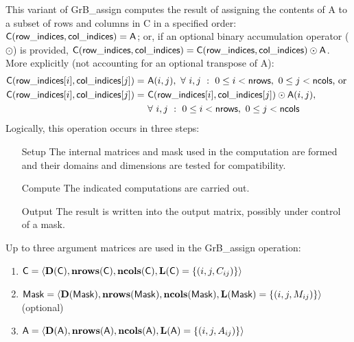This variant of {\sf GrB\_assign} computes the result of assigning the contents
of {\sf A} to a subset of rows and columns in {\sf C} in a specified order:
${\sf C}({\sf row\_indices},{\sf col\_indices}) = {\sf A}$; or, if an optional 
binary accumulation operator ($\odot$) is provided, 
${\sf C}({\sf row\_indices},{\sf col\_indices}) = 
{\sf C}({\sf row\_indices},{\sf col\_indices}) \odot {\sf A}$.
More explicitly (not accounting for an optional transpose of {\sf A}):
\[
\begin{aligned}
  	{\sf C}({\sf row\_indices}[i],{\sf col\_indices}[j]) = &\ {\sf A}(i,j), 
 	\ \forall \ i,j \ : \ 0 \leq i < {\sf nrows},\ 0 \leq j < {\sf ncols} \mbox{,~or~}
\\
  	{\sf C}({\sf row\_indices}[i],{\sf col\_indices}[j]) = &\ 
    {\sf C}({\sf row\_indices}[i],{\sf col\_indices}[j]) \odot {\sf A}(i,j), \\
 	& \ \forall \ i,j \ : \ 0 \leq i < {\sf nrows},\ 0 \leq j < {\sf ncols}
\end{aligned}
\]  
Logically, this operation occurs in three steps:
\begin{enumerate}[leftmargin=0.75in]
\item[Setup] The internal matrices and mask used in the computation are formed 
and their domains and dimensions are tested for compatibility.
\item[Compute] The indicated computations are carried out.
\item[Output] The result is written into the output matrix, possibly under 
control of a mask.
\end{enumerate}

Up to three argument matrices are used in the {\sf GrB\_assign} operation:
\begin{enumerate}
	\item ${\sf C} = \langle \bold{D}({\sf C}),\bold{nrows}({\sf C}),
    \bold{ncols}({\sf C}),\bold{L}({\sf C}) = \{(i,j,C_{ij}) \} \rangle$
    
	\item ${\sf Mask} = \langle \bold{D}({\sf Mask}),\bold{nrows}({\sf Mask}),
    \bold{ncols}({\sf Mask}),\bold{L}({\sf Mask}) = \{(i,j,M_{ij}) \} \rangle$ (optional)
    
	\item ${\sf A} = \langle \bold{D}({\sf A}),\bold{nrows}({\sf A}), 
    \bold{ncols}({\sf A}),\bold{L}({\sf A}) = \{(i,j,A_{ij}) \} \rangle$
\end{enumerate}

